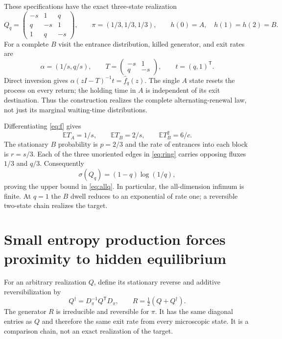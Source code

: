 \documentclass[11pt,a4paper]{article}
\newcommand{\E}{\mathbb E}
\newcommand{\sig}{\sigma}
\begin{document}
These specifications have the exact three-state realization
\begin{equation}\label{eq:ring}
 Q_q=\begin{pmatrix}-s&1&q\\q&-s&1\\1&q&-s\end{pmatrix},
 \qquad \pi=(1/3,1/3,1/3),
 \qquad h(0)=A,\quad h(1)=h(2)=B.
\end{equation}
For a complete $B$ visit the entrance distribution, killed generator, and exit rates are
\[
 \alpha=(1/s,q/s),\qquad
 T=\begin{pmatrix}-s&1\\q&-s\end{pmatrix},\qquad
 t=(q,1)^{\mathsf T}.
\]
Direct inversion gives $\alpha(zI-T)^{-1}t=\widehat f_q(z)$. The single $A$ state resets the process on every return; the holding time in $A$ is independent of its exit destination. Thus the construction realizes the complete alternating-renewal law, not just its marginal waiting-time distributions.

Differentiating \eqref{eq:f} gives
\begin{equation}\label{eq:means}
 \E T_A=1/s,\qquad \E T_B=2/s,\qquad \E T_B^2=6/c.
\end{equation}
The stationary $B$ probability is $p=2/3$ and the rate of entrances into each block is $r=s/3$. Each of the three unoriented edges in \eqref{eq:ring} carries opposing fluxes $1/3$ and $q/3$. Consequently
\begin{equation}\label{eq:upper}
 \sig(Q_q)=(1-q)\log(1/q),
\end{equation}
proving the upper bound in \eqref{eq:allq}. In particular, the all-dimension infimum is finite. At $q=1$ the $B$ dwell reduces to an exponential of rate one; a reversible two-state chain realizes the target.

\section{Small entropy production forces proximity to hidden equilibrium}
For an arbitrary realization $Q$, define its stationary reverse and additive reversibilization by
\begin{equation}\label{eq:R}
 Q^\dagger=D_\pi^{-1}Q^{\mathsf T}D_\pi,
 \qquad R=\tfrac12(Q+Q^\dagger).
\end{equation}
The generator $R$ is irreducible and reversible for $\pi$. It has the same diagonal entries as $Q$ and therefore the same exit rate from every microscopic state. It is a comparison chain, not an exact realization of the target.
\end{document}
